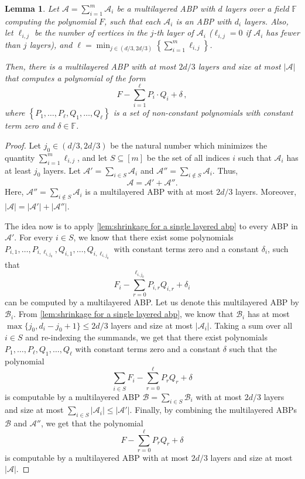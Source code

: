 \documentclass[10pt,a4paper]{article}
\newtheorem{lemma}[theorem]{Lemma}
\newcommand{\F}{\mathbb F}
\newcommand{\set}[1]{\left\{#1\right\}}
\newcommand{\abs}[1]{\left|#1\right|}
\begin{document}
\begin{lemma}\label{lem:shrinkage general}
	Let $\mathcal{A} = \sum_{i=1}^{m} \mathcal{A}_i$ be a multilayered ABP with $d$ layers over a field $\F$ computing the polynomial $F$, such that each $\mathcal{A}_i$ is an ABP with $d_i$ layers.
	Also, let $\ell_{i,j}$ be the number of vertices in the $j$-th layer of $\mathcal{A}_i$ ($\ell_{i,j} = 0$ if $\mathcal{A}_i$ has fewer than $j$ layers), and $\ell = \min_{j \in (d/3, 2d/3)} \set{\sum_{i=1}^m \ell_{i,j}}$.
	
	Then, there is a multilayered ABP  with at most $2d/3$ layers and size at most $\abs{\mathcal{A}}$ that computes a polynomial of the form
	\[F - \sum_{i=1}^{\ell} P_i \cdot Q_i + \delta \, , \]
	where $\set{P_1, \ldots, P_{\ell}, Q_1, \ldots, Q_{\ell}}$ is a set of non-constant polynomials with constant term zero and $\delta \in \F$.
\end{lemma}
	
\begin{proof}
	Let $j_0 \in (d/3, 2d/3)$ be the natural number which minimizes the quantity $\sum_{i=1}^m \ell_{i,j}$, and let $S \subseteq [m]$ be the set of all indices $i$ such that $\mathcal{A}_i$ has at least $j_0$ layers. Let $\mathcal{A}' = \sum_{i \in S}\mathcal{A}_i$ and $\mathcal{A}'' = \sum_{i \notin S}\mathcal{A}_i$. Thus, 
	\[
		\mathcal{A} = \mathcal{A}' + \mathcal{A}''.
	\]		
	Here, $\mathcal{A}'' = \sum_{i \notin S}\mathcal{A}_i$ is a multilayered ABP with at most $2d/3$ layers. Moreover, $\abs{\mathcal{A}} = \abs{\mathcal{A}'} + \abs{\mathcal{A}''}$.
		
	The idea now is to apply \autoref{lem:shrinkage for a single layered abp} to every ABP in $\mathcal{A}'$. For every $i \in S$, we know that there exist some polynomials $P_{i,1}, \ldots, P_{i, \ell_{i, {j_0}}}, Q_{i,1}, \ldots, Q_{i, \ell_{i, {j_0}}}$ with constant terms zero and a constant $\delta_i$, such that  
	\[
		F_i - \sum_{r = 0}^{\ell_{i, {j_0}}} P_{i, r}Q_{i,r} + \delta_i
	\]
	can be computed by a multilayered ABP. Let us denote this multilayered ABP by $\mathcal{B}_i$. From \autoref{lem:shrinkage for a single layered abp}, we know that $\mathcal{B}_i$ has at most $\max\{j_0, d_i-j_0+1\} \leq 2d/3$ layers and size at most $\abs{\mathcal{A}_i}$. Taking a sum over all $i \in S$ and re-indexing the summands, we get that there exist polynomials $P_{1}, \ldots, P_{\ell}, Q_{1}, \ldots, Q_{\ell}$ with constant terms zero and a constant $\delta$ such that the polynomial 
	\[
		\sum_{i\in S} F_i - \sum_{r = 0}^{\ell} P_{r}Q_{r} + \delta
	\]
	is computable by a multilayered ABP $\mathcal{B} = \sum_{i \in S} \mathcal{B}_i$ with at most $2d/3$ layers and size at most $\sum_{i \in S} \abs{\mathcal{A}_i} \leq \abs{\mathcal{A}'}$. Finally, by combining the multilayered ABPs $\mathcal{B}$ and $\mathcal{A}''$, we get that the polynomial 
	\[
		F  - \sum_{r = 0}^{\ell} P_{r}Q_{r} + \delta
	\]
	is computable by a multilayered ABP with at most $2d/3$ layers and size at most $\abs{\mathcal{A}}$.
\end{proof}
	
\end{document}
